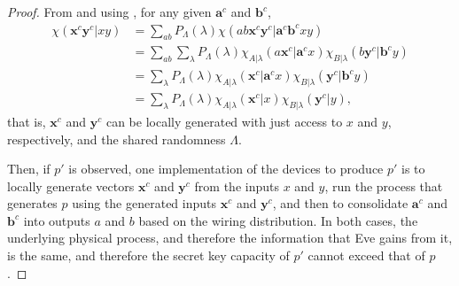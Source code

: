 \documentclass[10pt, a4paper]{article}
\numberwithin{equation}{section} %
\theoremstyle{definition}
\theoremstyle{plain}
\newcommand{\?}{\mathrel{?}} %
\newcommand{\cvec}[1]{\boldsymbol{\mathbf{#1}}}    %
\begin{document}
              \begin{proof}
                From  and using , for any given \(\cvec{a}^c\) and \(\cvec{b}^c\),
                \begin{align}
                  \chi(\cvec{x}^c\cvec{y}^c|xy) &= \sum_{ab} P_{\Lambda}(\lambda) \chi(ab\cvec{x}^c\cvec{y}^c|\cvec{a}^c\cvec{b}^cxy) \\
                                                &= \sum_{ab} \sum_{\lambda} P_{\Lambda}(\lambda) \chi_{A|\lambda}(a\cvec{x}^c|\cvec{a}^cx) \chi_{B|\lambda}(b\cvec{y}^c|\cvec{b}^cy) \\
                                                &= \sum_{\lambda} P_{\Lambda}(\lambda) \chi_{A|\lambda}(\cvec{x}^c|\cvec{a}^cx) \chi_{B|\lambda}(\cvec{y}^c|\cvec{b}^cy)  \\
                                                &= \sum_{\lambda} P_{\Lambda}(\lambda) \chi_{A|\lambda}(\cvec{x}^c|x) \chi_{B|\lambda}(\cvec{y}^c|y),\label{eqn:nooutputmwir}
                \end{align}
                that is, \(\cvec{x}^c\) and \(\cvec{y}^c\) can be locally generated with just access to \(x\) and \(y\), respectively, and the shared randomness \(\Lambda\).

                Then, if \(p'\) is observed, one implementation of the devices to produce \(p'\) is to locally generate vectors \(\cvec{x}^c\) and \(\cvec{y}^c\) from the inputs \(x\) and \(y\), run the process that generates \(p\) using the generated inputs \(\cvec{x}^c\) and \(\cvec{y}^c\), and then to consolidate \(\cvec{a}^c\) and \(\cvec{b}^c\) into outputs \(a\) and \(b\) based on the wiring distribution. In both cases, the underlying physical process, and therefore the information that Eve gains from it, is the same, and therefore the secret key capacity of \(p'\) cannot exceed that of \(p\).


\end{proof}
\end{document}
